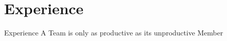 \section{Experience}
\begin{frame}{Experience}
A Team is only as productive as its unproductive Member
\end{frame}